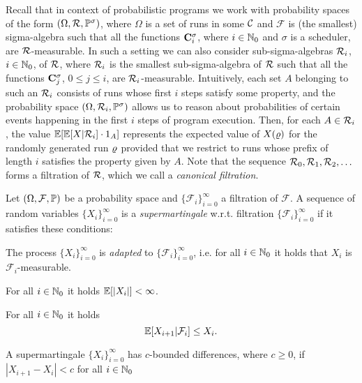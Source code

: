 Recall that in context of probabilistic programs we work with probability 
spaces of the form $(\Omega,\mathcal{R},\mathbb{P}^\sigma)$, where $\Omega$ is a 
set of runs in some $\mathcal{C}$ and $\mathcal{F}$ is (the smallest) sigma-algebra 
such that all the functions $\mathbf{C}^{\sigma}_{i}$, where $i\in \mathbb{N}_0$ and 
$\sigma$ is a scheduler, are $\mathcal{R}$-measurable. In such a setting we can 
also consider sub-sigma-algebras $\mathcal{R}_i$, $i\in \mathbb{N}_0$, of 
$\mathcal{R}$, where $\mathcal{R}_i$ is the smallest sub-sigma-algebra of 
$\mathcal{R}$ such that all the functions $\mathbf{C}^{\sigma}_{j}$, $0\leq j \leq 
i$, are $\mathcal{R}_i$-measurable. Intuitively, each set $A$ belonging to such 
an $\mathcal{R}_i$ consists of runs whose first $i$ steps satisfy some 
property, and the probability space $(\Omega,\mathcal{R}_i,\mathbb{P}^\sigma)$ 
allows us to reason about probabilities of certain events happening in the 
first 
$i$ steps of program execution. 
Then, for each $A\in \mathcal{R}_i$, the 
value $\mathbb{E}[\mathbb{E}[X|\mathcal{R}_i]\cdot 1_A]$ represents the expected value of 
$X(\varrho)$ for the randomly generated run $\varrho$ provided that we restrict to 
runs whose
prefix of length $i$ satisfies the property given by $A$. 
Note that the sequence $\mathcal{R}_0,\mathcal{R}_1,\mathcal{R}_2,\dots$ forms a 
filtration of $\mathcal{R}$, which we call a \emph{canonical filtration}.


\smallskip
\begin{definition}[Supermartingale]
Let $(\Omega,\mathcal{F},\mathbb{P})$ be a probability space and 
$\{\mathcal{F}_i\}_{i=0}^{\infty}$ a filtration of $\mathcal{F}$. A sequence of 
random variables $\{X_i\}_{i=0}^{\infty}$ is a \emph{supermartingale} w.r.t. 
filtration $\{\mathcal{F}_i\}_{i=0}^{\infty}$ if it satisfies these conditions:
\begin{compactenum}
\item  The process $\{X_i\}_{i=0}^{\infty}$ is \emph{adapted} to 
$\{\mathcal{F}_i\}_{i=0}^{\infty}$, i.e. for all $i\in \mathbb{N}_0$ it holds that 
$X_i$ is $\mathcal{F}_i$-measurable.
\item For all $i\in \mathbb{N}_0$ it holds $\mathbb{E}[|X_i|]<\infty$.
\item For all $i\in \mathbb{N}_0$ it holds 
\begin{equation}
\label{eq:supermart-def}
\mathbb{E}[X_{i+1}|\mathcal{F}_i] \leq X_i.
\end{equation}

A supermartingale $\{X_i\}_{i=0}^{\infty}$ has $c$-bounded differences, where 
$c\geq 0$, if $|X_{i+1}-X_i|<c$ for all $i\in \mathbb{N}_0$
\end{compactenum}
\end{definition}



